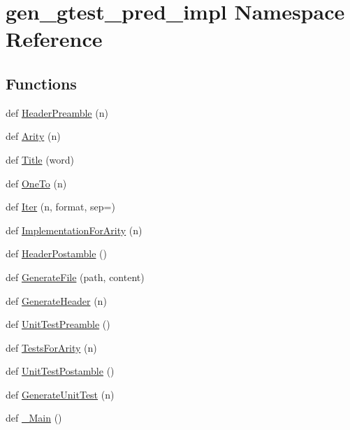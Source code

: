 \hypertarget{namespacegen__gtest__pred__impl}{}\section{gen\+\_\+gtest\+\_\+pred\+\_\+impl Namespace Reference}
\label{namespacegen__gtest__pred__impl}
\subsection*{Functions}
\begin{DoxyCompactItemize}
\item 
def \mbox{\hyperlink{namespacegen__gtest__pred__impl_a0b99cadcffab4bf161654a382163bac8}{Header\+Preamble}} (n)
\item 
def \mbox{\hyperlink{namespacegen__gtest__pred__impl_a5bbb7272f3588b969ab3ded6f49836a1}{Arity}} (n)
\item 
def \mbox{\hyperlink{namespacegen__gtest__pred__impl_ae49dd9bd9152dbcb3ca7994ce04c37ba}{Title}} (word)
\item 
def \mbox{\hyperlink{namespacegen__gtest__pred__impl_a7920598d51c9dded76a4ef9ffde339e4}{One\+To}} (n)
\item 
def \mbox{\hyperlink{namespacegen__gtest__pred__impl_ac016218b7c9437d1d5ac85c574c83069}{Iter}} (n, format, sep=\textquotesingle{}\textquotesingle{})
\item 
def \mbox{\hyperlink{namespacegen__gtest__pred__impl_a8c53b141b89f9c05d0131d9756dfeab0}{Implementation\+For\+Arity}} (n)
\item 
def \mbox{\hyperlink{namespacegen__gtest__pred__impl_a3d40c7ef70cf4d46e56c9612f34027bf}{Header\+Postamble}} ()
\item 
def \mbox{\hyperlink{namespacegen__gtest__pred__impl_a16210fe365dfd176e04aa2578ac5a8d9}{Generate\+File}} (path, content)
\item 
def \mbox{\hyperlink{namespacegen__gtest__pred__impl_a6f3039a82a5283846fb272f8a3af6743}{Generate\+Header}} (n)
\item 
def \mbox{\hyperlink{namespacegen__gtest__pred__impl_ae52dc86461d1b666c7b658a8c27c69f9}{Unit\+Test\+Preamble}} ()
\item 
def \mbox{\hyperlink{namespacegen__gtest__pred__impl_ab0da913fa15e5695d5bb2dd1de5dec57}{Tests\+For\+Arity}} (n)
\item 
def \mbox{\hyperlink{namespacegen__gtest__pred__impl_a57b922f50d0807896496dcd883c1f098}{Unit\+Test\+Postamble}} ()
\item 
def \mbox{\hyperlink{namespacegen__gtest__pred__impl_acbd42b5b7fb7ddbb06a4dd58fc37e9ed}{Generate\+Unit\+Test}} (n)
\item 
def \mbox{\hyperlink{namespacegen__gtest__pred__impl_a50dd74615a1507ce657c8fa24d7c161e}{\+\_\+\+Main}} ()
\end{DoxyCompactItemize}
